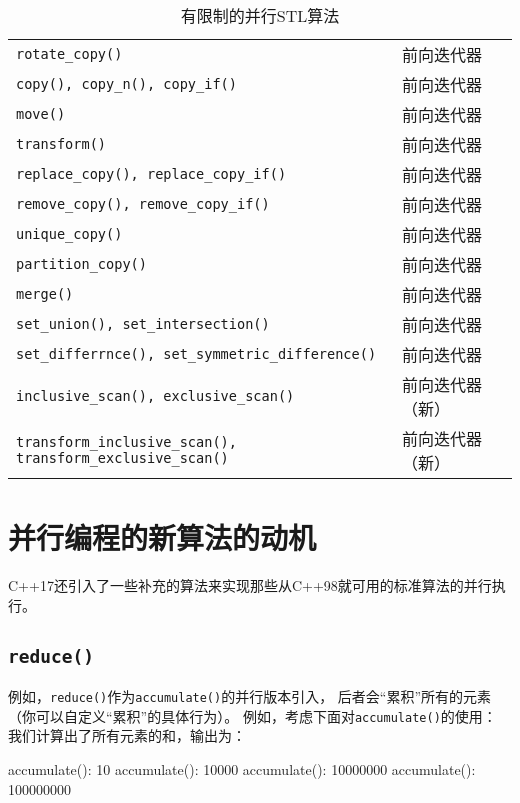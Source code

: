 \begin{table}[htb]
\begin{tabular}{l|l}
        \texttt{rotate\_copy()}                                             & 前向迭代器                   \\
        \texttt{copy(), copy\_n(), copy\_if()}                              & 前向迭代器                   \\
        \texttt{move()}                                                     & 前向迭代器                   \\
        \texttt{transform()}                                                & 前向迭代器                   \\
        \texttt{replace\_copy(), replace\_copy\_if()}                       & 前向迭代器                   \\
        \texttt{remove\_copy(), remove\_copy\_if()}                         & 前向迭代器                   \\
        \texttt{unique\_copy()}                                             & 前向迭代器                   \\
        \texttt{partition\_copy()}                                          & 前向迭代器                   \\
        \texttt{merge()}                                                    & 前向迭代器                   \\
        \texttt{set\_union(), set\_intersection()}                          & 前向迭代器                   \\
        \texttt{set\_differrnce(), set\_symmetric\_difference()}            & 前向迭代器                   \\
        \texttt{inclusive\_scan(), exclusive\_scan()}                       & 前向迭代器（新）                \\
        \texttt{transform\_inclusive\_scan(), transform\_exclusive\_scan()} & 前向迭代器（新）                \\
        \hline
    \end{tabular}
    \caption{有限制的并行STL算法}
    \label{t22.4}
\end{table}


\section{并行编程的新算法的动机}\label{ch22.6}
C++17还引入了一些补充的算法来实现那些从C++98就可用的标准算法的并行执行。

\subsection{\texttt{reduce()}}\label{ch22.6.1}
例如，\texttt{reduce()}作为\texttt{accumulate()}的并行版本引入，
后者会“累积”所有的元素（你可以自定义“累积”的具体行为）。
例如，考虑下面对\texttt{accumulate()}的使用：
我们计算出了所有元素的和，输出为：
\begin{blacklisting}
    accumulate(): 10
    accumulate(): 10000
    accumulate(): 10000000
    accumulate(): 100000000
\end{blacklisting}

